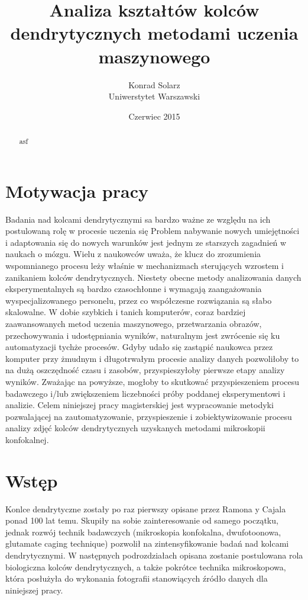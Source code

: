 \documentclass{article}
\begin{document}
\title{Analiza kształtów kolców dendrytycznych metodami uczenia maszynowego}
\author{Konrad Solarz\\Uniwerstytet Warszawski}
\date{Czerwiec 2015}
\maketitle
\clearpage
\begin{abstract}
asf

\end{abstract}
\clearpage

\tableofcontents
\clearpage

\section{Motywacja pracy}
Badania nad kolcami dendrytycznymi sa bardzo ważne ze względu na ich postulowaną rolę w procesie uczenia się %
Problem nabywanie nowych umiejętności i adaptowania się do nowych warunków jest jednym ze starszych zagadnień w naukach o mózgu.
Wielu z naukowców uważa, że klucz do zrozumienia wspomnianego procesu leży właśnie w mechanizmach sterujących wzrostem i zanikaniem kolców dendrytycznych.
Niestety obecne metody analizowania danych eksperymentalnych są bardzo czasochłonne i wymagają zaangażowania wyspecjalizowanego personelu, przez co współczesne rozwiązania są słabo skalowalne.
W dobie szybkich i tanich komputerów, coraz bardziej zaawansowanych metod uczenia maszynowego, przetwarzania obrazów, przechowywania i udostępniania wyników, naturalnym jest zwrócenie się ku automatyzacji tychże procesów.
Gdyby udało się zastąpić naukowca przez komputer przy żmudnym i długotrwałym procesie analizy danych pozwoliłoby to na dużą oszczędność czasu i zasobów, przyspieszyłoby pierwsze etapy analizy wyników.
Zważając na powyższe, mogłoby to skutkować przyspieszeniem procesu badawczego i/lub zwiększeniem liczebności próby poddanej eksperymentowi i analizie.
Celem niniejszej pracy magisterskiej jest wypracowanie metodyki pozwalającej na zautomatyzowanie, przyspieszenie i zobiektywizowanie procesu analizy zdjęć kolców dendrytycznych uzyskanych metodami mikroskopii konfokalnej.



\section{Wstęp}
Konlce dendrytyczne zostały po raz pierwszy opisane przez Ramona y Cajala ponad 100 lat temu. %
Skupiły na sobie zainteresowanie od samego początku, jednak rozwój technik badawczych (mikroskopia konfokalna, dwufotoonowa,
glutamate caging technique) %
pozwolił na zintensyfikowanie badań nad kolcami dendrytycznymi. W następnych podrozdziałach opisana zostanie postulowana rola
biologiczna kolców dendrytycznych, a także pokrótce technika mikroskopowa, która posłużyła do wykonania fotografii stanowiących źródło danych dla niniejszej pracy. 
    
\end{document}
